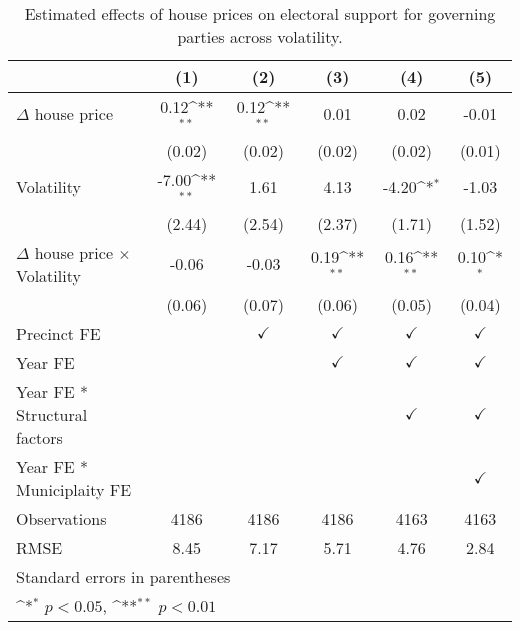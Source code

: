 \begin{table}[htbp]\centering
\def\sym#1{\ifmmode^{#1}\else\(^{#1}\)\fi}
\caption{Estimated effects of house prices on electoral support for governing parties across volatility.} \label{tab5}
\begin{tabular}{l*{5}{c}}
\hline\hline
                    &\multicolumn{1}{c}{(1)}        &\multicolumn{1}{c}{(2)}        &\multicolumn{1}{c}{(3)}        &\multicolumn{1}{c}{(4)}        &\multicolumn{1}{c}{(5)}        \\
\hline
$\Delta$ house price&        0.12\sym{**}&        0.12\sym{**}&        0.01        &        0.02        &       -0.01        \\
                    &      (0.02)        &      (0.02)        &      (0.02)        &      (0.02)        &      (0.01)        \\
[1em]
Volatility          &       -7.00\sym{**}&        1.61        &        4.13        &       -4.20\sym{*} &       -1.03        \\
                    &      (2.44)        &      (2.54)        &      (2.37)        &      (1.71)        &      (1.52)        \\
[1em]
$\Delta$ house price $\times$ Volatility&       -0.06        &       -0.03        &        0.19\sym{**}&        0.16\sym{**}&        0.10\sym{*} \\
                    &      (0.06)        &      (0.07)        &      (0.06)        &      (0.05)        &      (0.04)        \\
[1em]
\hline Precinct FE  &                    &$\checkmark$        &$\checkmark$        &$\checkmark$        &$\checkmark$        \\
[1em]
Year FE             &                    &                    &$\checkmark$        &$\checkmark$        &$\checkmark$        \\
[1em]
Year FE * Structural factors&                    &                    &                    &$\checkmark$        &$\checkmark$        \\
[1em]
Year FE * Municiplaity FE&                    &                    &                    &                    &$\checkmark$        \\
\hline
Observations        &        4186        &        4186        &        4186        &        4163        &        4163        \\
RMSE                &        8.45        &        7.17        &        5.71        &        4.76        &        2.84        \\
\hline\hline
\multicolumn{6}{l}{\footnotesize Standard errors in parentheses}\\
\multicolumn{6}{l}{\footnotesize \sym{*} \(p<0.05\), \sym{**} \(p<0.01\)}\\
\end{tabular}
\end{table}
